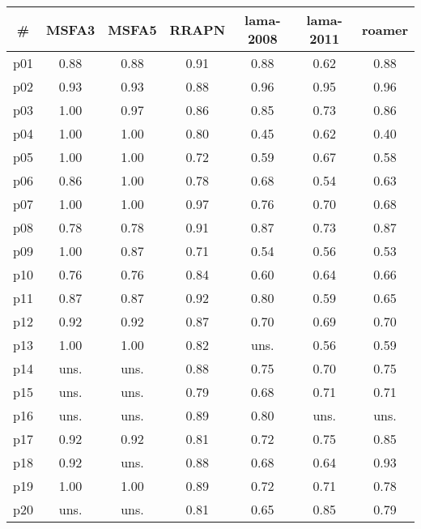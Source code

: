 \begin{tabular}{ccccccc}
\toprule
\textbf{\#} & \textbf{MSFA3} & \textbf{MSFA5} & \textbf{RRAPN} & \textbf{lama-2008} & \textbf{lama-2011} & \textbf{roamer}\\
\midrule
p01 & 0.88 & 0.88 & 0.91 & 0.88 & 0.62 & 0.88\\
p02 & 0.93 & 0.93 & 0.88 & 0.96 & 0.95 & 0.96\\
p03 & 1.00 & 0.97 & 0.86 & 0.85 & 0.73 & 0.86\\
p04 & 1.00 & 1.00 & 0.80 & 0.45 & 0.62 & 0.40\\
p05 & 1.00 & 1.00 & 0.72 & 0.59 & 0.67 & 0.58\\
p06 & 0.86 & 1.00 & 0.78 & 0.68 & 0.54 & 0.63\\
p07 & 1.00 & 1.00 & 0.97 & 0.76 & 0.70 & 0.68\\
p08 & 0.78 & 0.78 & 0.91 & 0.87 & 0.73 & 0.87\\
p09 & 1.00 & 0.87 & 0.71 & 0.54 & 0.56 & 0.53\\
p10 & 0.76 & 0.76 & 0.84 & 0.60 & 0.64 & 0.66\\
p11 & 0.87 & 0.87 & 0.92 & 0.80 & 0.59 & 0.65\\
p12 & 0.92 & 0.92 & 0.87 & 0.70 & 0.69 & 0.70\\
p13 & 1.00 & 1.00 & 0.82 & uns. & 0.56 & 0.59\\
p14 & uns. & uns. & 0.88 & 0.75 & 0.70 & 0.75\\
p15 & uns. & uns. & 0.79 & 0.68 & 0.71 & 0.71\\
p16 & uns. & uns. & 0.89 & 0.80 & uns. & uns.\\
p17 & 0.92 & 0.92 & 0.81 & 0.72 & 0.75 & 0.85\\
p18 & 0.92 & uns. & 0.88 & 0.68 & 0.64 & 0.93\\
p19 & 1.00 & 1.00 & 0.89 & 0.72 & 0.71 & 0.78\\
p20 & uns. & uns. & 0.81 & 0.65 & 0.85 & 0.79\\
\bottomrule
\end{tabular}

